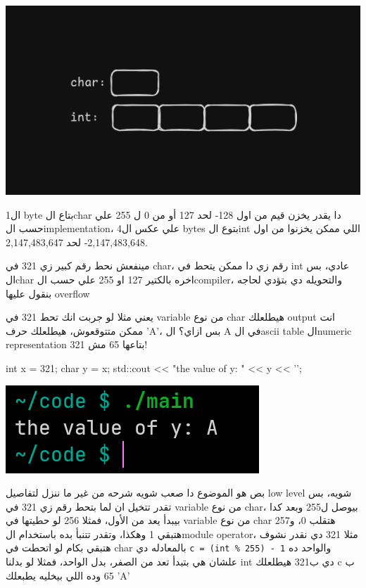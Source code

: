 \documentclass[11pt]{article}
\let\OriginalVerbatim\verbatim
\let\endOriginalVerbatim\endverbatim
\renewenvironment{verbatim}{\begin{english}\OriginalVerbatim}{\endOriginalVerbatim\end{english}}
\begin{document}
\begin{center}
\includegraphics[width=.9\linewidth]{../images/int_char_size.png}
\end{center}

ال1 byte بتاع الchar دا يقدر يخزن قيم من اول 128- لحد 127 أو من 0 ل 255 علي حسب الimplementation، علي عكس ال4 bytes بتوع الint اللي ممكن يخزنوا من اول 2,147,483,648- لحد 2,147,483,647.

مينفعش نحط رقم كبير زي 321 في char، رقم زي دا ممكن يتحط في int عادي، بس الchar اخره بالكتير 127 او 255 علي حسب الcompiler، والتحويله دي بتؤدي لحاجه بنقول عليها overflow

يعني مثلا لو جربت انك تحط 321 في variable من نوع char هيطلعلك output انت ممكن متتوقعوش، هيطلعلك حرف 'A'، بس ازاي؟ ال A في الascii table الnumeric representation بتاعها 65 مش 321!

\begin{verbatim}
int x = 321;
char y = x;
std::cout << "the value of y: " << y << '\n';
\end{verbatim}

\begin{center}
\includegraphics[width=.9\linewidth]{../images/int_to_char.png}
\end{center}

بص هو الموضوع دا صعب شويه شرحه من غير ما ننزل لتفاصيل low level شويه، بس تقدر تتخيل ان لما بتحط رقم زي 321 في variable من نوع char، بيوصل ل255 وبعد كدا بيبدأ يعد من الأول، فمثلا 256 لو حطيتها في variable من نوع char هتقلب 0، و257 هتبقي 1 وهكذا، وتقدر تتنبأ بده باستخدام الmodule operator، مثلا 321 دي نقدر نشوف هتبقي بكام لو اتحطت في char بالمعادله دي \texttt{c = (int \% 255) - 1} والواحد ده علشان هي بتبدأ تعد من الصفر، بدل الواحد، فمثلا لو بدلنا int دي ب321 هيطلعلك c ب 65 وده اللي بيخليه يطبعلك 'A'
\end{document}
